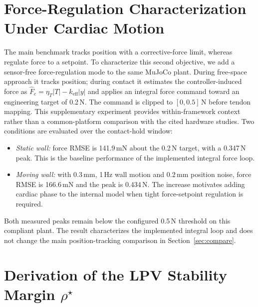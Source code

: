 \appendices

\section{Force-Regulation Characterization Under Cardiac Motion}\label{app:forcereg}

The main benchmark tracks position with a corrective-force limit, whereas~\cite{jolaei2020,kesner2014} regulate force to a setpoint. To characterize this second objective, we add a sensor-free force-regulation mode to the same MuJoCo plant. During free-space approach it tracks position; during contact it estimates the controller-induced force as $\hat F_c=\eta_T|T|-k_{\text{eff}}|y|$ and applies an integral force command toward an engineering target of 0.2\,N. The command is clipped to $[0,0.5]$\,N before tendon mapping. This supplementary experiment provides within-framework context rather than a common-platform comparison with the cited hardware studies. Two conditions are evaluated over the contact-hold window:
\begin{itemize}
\item \emph{Static wall:} force RMSE is 141.9\,mN about the 0.2\,N target, with a 0.347\,N peak. This is the baseline performance of the implemented integral force loop.
\item \emph{Moving wall:} with 0.3\,mm, 1\,Hz wall motion and 0.2\,mm position noise, force RMSE is 166.6\,mN and the peak is 0.434\,N. The increase motivates adding cardiac phase to the internal model when tight force-setpoint regulation is required.
\end{itemize}

Both measured peaks remain below the configured 0.5\,N threshold on this compliant plant. The result characterizes the implemented integral loop and does not change the main position-tracking comparison in Section~\ref{sec:compare}.

\section{Derivation of the LPV Stability Margin $\rho^\star$}\label{app:lpv}

